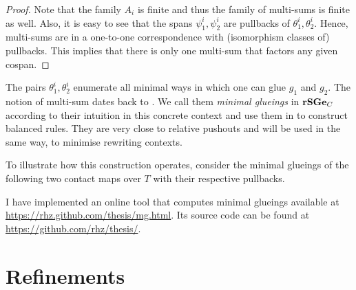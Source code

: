 \begin{proof}
  Note that the family $A_i$ is finite
  and thus the family of multi-sums is finite as well.
  Also, it is easy to see that the spans $\psi^i_1,\psi^i_2$
  are pullbacks of $\theta^i_1,\theta^i_2$.
  Hence, multi-sums are in a one-to-one correspondence
  with (isomorphism classes of) pullbacks.
  This implies that there is only one multi-sum
  that factors any given cospan.
\end{proof}

The pairs $\theta^i_1,\theta^i_2$ enumerate
all minimal ways in which one can glue $g_1$ and $g_2$.
%
The notion of multi-sum dates back to \citet{diers}.
We call them \emph{minimal glueings} in $\mathbf{rSGe}_C$
according to their intuition in this concrete context
and use them in  to construct balanced rules.
They are very close to relative pushouts \citep{leifer}
and will be used in the same way,
to minimise rewriting contexts.

To illustrate how this construction operates,
consider the minimal glueings of the following
two contact maps over $T$ %
with their respective pullbacks.


I have implemented an online tool that computes minimal glueings
available at \url{https://rhz.github.com/thesis/mg.html}.
Its source code can be found at \url{https://github.com/rhz/thesis/}.


\section{Refinements}
\label{sec:refinements}

